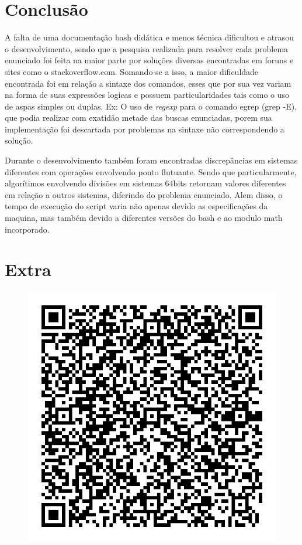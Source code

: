 \documentclass[12pt]{article}
\begin{document}
\pagebreak

\section{Conclusão}

A falta de uma documentação bash didática e menos técnica dificultou e atrasou o desenvolvimento, sendo que a pesquisa realizada para resolver cada problema enunciado  foi feita na maior parte por soluções diversas encontradas em foruns e sites como o stackoverflow.com. Somando-se a isso, a maior dificuldade encontrada foi em relação a sintaxe dos comandos, esses que por sua vez variam na forma de suas expressões logicas e possuem particularidades tais como o uso de aspas simples ou duplas. Ex: O uso de \textit{regexp} para o comando egrep (grep -E), que podia realizar com exatidão metade das buscas enunciadas, porem sua implementação foi descartada por problemas na sintaxe não correspondendo a solução.

Durante o desenvolvimento também foram encontradas discrepâncias em sistemas diferentes com operações envolvendo ponto flutuante. Sendo que particularmente, algorítimos envolvendo divisões em sistemas 64bits retornam valores diferentes em relação a outros sistemas, diferindo do problema enunciado. Alem disso, o tempo de execução do script varia não apenas devido as especificações da maquina, mas também devido a diferentes versões do bash e ao modulo math incorporado.

\pagebreak

\section{Extra}

\begin{figure}[h]
    \centering
    \includegraphics[scale=0.3]{imagens/extra.jpg}
\end{figure}
\end{document}
